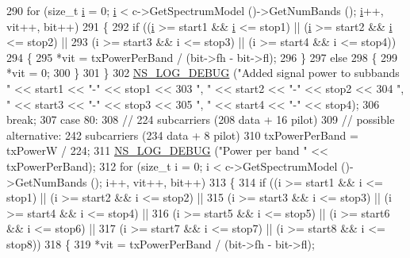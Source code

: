 \begin{DoxyCode}
290       \textcolor{keywordflow}{for} (\textcolor{keywordtype}{size\_t} \hyperlink{bernuolliDistribution_8m_a6f6ccfcf58b31cb6412107d9d5281426}{i} = 0; \hyperlink{bernuolliDistribution_8m_a6f6ccfcf58b31cb6412107d9d5281426}{i} < c->GetSpectrumModel ()->GetNumBands (); \hyperlink{bernuolliDistribution_8m_a6f6ccfcf58b31cb6412107d9d5281426}{i}++, vit++, bit++)
291         \{
292           \textcolor{keywordflow}{if} ((\hyperlink{bernuolliDistribution_8m_a6f6ccfcf58b31cb6412107d9d5281426}{i} >= start1 && \hyperlink{bernuolliDistribution_8m_a6f6ccfcf58b31cb6412107d9d5281426}{i} <= stop1) || (\hyperlink{bernuolliDistribution_8m_a6f6ccfcf58b31cb6412107d9d5281426}{i} >= start2 && \hyperlink{bernuolliDistribution_8m_a6f6ccfcf58b31cb6412107d9d5281426}{i} <= stop2) ||
293               (i >= start3 && i <= stop3) || (i >= start4 && i <= stop4))
294             \{
295               *vit = txPowerPerBand / (bit->fh - bit->fl);
296             \}
297           \textcolor{keywordflow}{else}
298             \{
299               *vit = 0;
300             \}
301         \}
302       \hyperlink{group__logging_ga413f1886406d49f59a6a0a89b77b4d0a}{NS\_LOG\_DEBUG} (\textcolor{stringliteral}{"Added signal power to subbands "} << start1 << \textcolor{stringliteral}{"-"} << stop1 <<
303                     \textcolor{stringliteral}{", "} << start2 << \textcolor{stringliteral}{"-"} << stop2 <<
304                     \textcolor{stringliteral}{", "} << start3 << \textcolor{stringliteral}{"-"} << stop3 <<
305                     \textcolor{stringliteral}{", "} << start4 << \textcolor{stringliteral}{"-"} << stop4);
306       \textcolor{keywordflow}{break};
307     \textcolor{keywordflow}{case} 80:
308       \textcolor{comment}{// 224 subcarriers (208 data + 16 pilot) }
309       \textcolor{comment}{// possible alternative:  242 subcarriers (234 data + 8 pilot)}
310       txPowerPerBand = txPowerW / 224;
311       \hyperlink{group__logging_ga413f1886406d49f59a6a0a89b77b4d0a}{NS\_LOG\_DEBUG} (\textcolor{stringliteral}{"Power per band "} << txPowerPerBand);
312       \textcolor{keywordflow}{for} (\textcolor{keywordtype}{size\_t} i = 0; i < c->GetSpectrumModel ()->GetNumBands (); i++, vit++, bit++)
313         \{
314           \textcolor{keywordflow}{if} ((i >= start1 && i <= stop1) || (i >= start2 && i <= stop2) ||
315               (i >= start3 && i <= stop3) || (i >= start4 && i <= stop4) ||
316               (i >= start5 && i <= stop5) || (i >= start6 && i <= stop6) ||
317               (i >= start7 && i <= stop7) || (i >= start8 && i <= stop8))
318             \{
319               *vit = txPowerPerBand / (bit->fh - bit->fl);

\end{DoxyCode}
